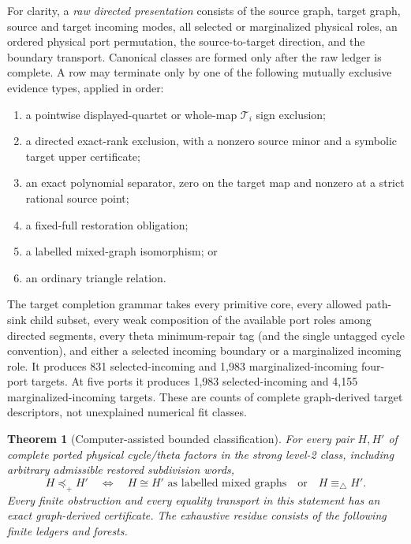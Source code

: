 \documentclass[11pt]{article}
\newtheorem{theorem}{Theorem}[section]
\theoremstyle{remark}
\newcommand{\preceqplus}{\preceq_+}
\newcommand{\trianglerel}{\equiv_\triangle}
\newcommand{\1}{\mathbf 1}
\begin{document}
For clarity, a \emph{raw directed presentation} consists of the source graph,
target graph, source and target incoming modes, all selected or marginalized
physical roles, an ordered physical port permutation, the source-to-target
direction, and the boundary transport.  Canonical classes are formed only
after the raw ledger is complete.  A row may terminate only by one of the
following mutually exclusive evidence types, applied in order:
\begin{enumerate}[label=(\roman*)]
  \item a pointwise displayed-quartet or whole-map \(\mathcal T_i\) sign
        exclusion;
  \item a directed exact-rank exclusion, with a nonzero source minor and a
        symbolic target upper certificate;
  \item an exact polynomial separator, zero on the target map and nonzero at
        a strict rational source point;
  \item a fixed-full restoration obligation;
  \item a labelled mixed-graph isomorphism; or
  \item an ordinary triangle relation.
\end{enumerate}

The target completion grammar takes every primitive core, every allowed
path-sink child subset, every weak composition of the available port roles
among directed segments, every theta minimum-repair tag (and the single
untagged cycle convention), and either a selected incoming boundary or a
marginalized incoming role.  It produces 831
selected-incoming and 1,983 marginalized-incoming four-port targets.  At five
ports it produces 1,983 selected-incoming and 4,155 marginalized-incoming
targets.  These are counts of complete graph-derived target descriptors, not
unexplained numerical fit classes.

\begin{theorem}[Computer-assisted bounded classification]
\label{thm:bounded}
For every pair \(H,H'\) of complete ported physical cycle/theta factors in
the strong level-2 class, including arbitrary admissible restored subdivision
words,
\[
 H\preceqplus H'
 \quad\Longleftrightarrow\quad
 H\cong H'\text{ as labelled mixed graphs}
 \quad\text{or}\quad H\trianglerel H'.
\]
Every finite obstruction and every equality transport in this statement has
an exact graph-derived certificate.  The exhaustive residue consists of the
following finite ledgers and forests.
\end{theorem}
\end{document}
